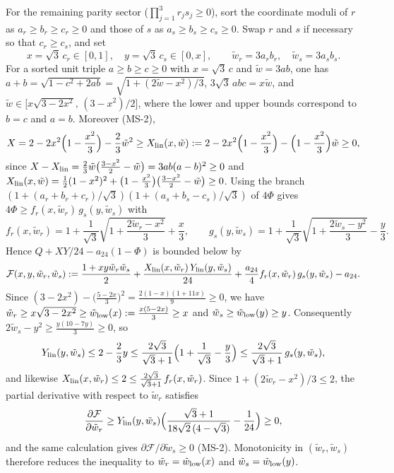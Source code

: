 For the remaining parity sector ($\prod_{j=1}^3 r_j s_j\ge0$), sort the
coordinate moduli of $r$ as $a_r\ge b_r\ge c_r\ge0$ and those of $s$ as
$a_s\ge b_s\ge c_s\ge0$. Swap $r$ and $s$ if necessary so that
$c_r\ge c_s$, and set
\[
 x=\sqrt3\,c_r\in[0,1],\quad y=\sqrt3\,c_s\in[0,x],\qquad
 \tilde w_r=3a_rb_r,\quad \tilde w_s=3a_sb_s.
\]
For a sorted unit triple $a\ge b\ge c\ge0$ with $x=\sqrt3\,c$ and
$\tilde w=3ab$, one has $a+b=\sqrt{1-c^2+2ab}=\sqrt{1+(2\tilde w-x^2)/3}$,
$3\sqrt3\,abc=x\tilde w$, and
$\tilde w\in\bigl[x\sqrt{3-2x^2},\,(3-x^2)/2\bigr]$, where the lower and
upper bounds correspond to $b=c$ and $a=b$. Moreover (MS-2),
\[
 X=2-2x^2\Bigl(1-\frac{x^2}{3}\Bigr)-\frac23\tilde w^2
  \ge X_{\rm lin}(x,\tilde w)
  :=2-2x^2\Bigl(1-\frac{x^2}{3}\Bigr)-\Bigl(1-\frac{x^2}{3}\Bigr)\tilde w\ge0,
\]
since $X-X_{\rm lin}=\frac23\tilde w\bigl(\frac{3-x^2}{2}-\tilde w\bigr)=3ab(a-b)^2\ge0$
and $X_{\rm lin}(x,\tilde w)=\frac12(1-x^2)^2+\bigl(1-\frac{x^2}{3}\bigr)\bigl(\frac{3-x^2}{2}-\tilde w\bigr)\ge0$.
Using the branch $(1+(a_r+b_r+c_r)/\sqrt3)(1+(a_s+b_s-c_s)/\sqrt3)$ of $4\Phi$ gives
$4\Phi\ge f_r(x,\tilde w_r)\,g_s(y,\tilde w_s)$ with
\[
 f_r(x,\tilde w_r)=1+\frac1{\sqrt3}\sqrt{1+\frac{2\tilde w_r-x^2}{3}}+\frac x3,\qquad
 g_s(y,\tilde w_s)=1+\frac1{\sqrt3}\sqrt{1+\frac{2\tilde w_s-y^2}{3}}-\frac y3.
\]
Hence $Q+XY/24-a_{24}(1-\Phi)$ is bounded below by
\[
 \mathcal F(x,y,\tilde w_r,\tilde w_s)
 :=\frac{1+xy\tilde w_r\tilde w_s}{2}
   +\frac{X_{\rm lin}(x,\tilde w_r)\,Y_{\rm lin}(y,\tilde w_s)}{24}
   +\frac{a_{24}}{4}f_r(x,\tilde w_r)\,g_s(y,\tilde w_s)-a_{24}.
\]
Since $(3-2x^2)-\bigl(\frac{5-2x}{3}\bigr)^2=\frac{2(1-x)(1+11x)}{9}\ge0$,
we have $\tilde w_r\ge x\sqrt{3-2x^2}\ge\tilde w_{\rm low}(x):=\frac{x(5-2x)}{3}\ge x$
and $\tilde w_s\ge\tilde w_{\rm low}(y)\ge y$. Consequently $2\tilde w_s-y^2\ge\frac{y(10-7y)}{3}\ge0$, so
\[
 Y_{\rm lin}(y,\tilde w_s)\le2-\frac23y
 \le\frac{2\sqrt3}{\sqrt3+1}\Bigl(1+\frac1{\sqrt3}-\frac y3\Bigr)
 \le\frac{2\sqrt3}{\sqrt3+1}\,g_s(y,\tilde w_s),
\]
and likewise $X_{\rm lin}(x,\tilde w_r)\le2\le\frac{2\sqrt3}{\sqrt3+1}\,f_r(x,\tilde w_r)$.
Since $1+(2\tilde w_r-x^2)/3\le2$, the partial derivative with respect to $\tilde w_r$ satisfies
\[
 \frac{\partial\mathcal F}{\partial\tilde w_r}
 \ge Y_{\rm lin}(y,\tilde w_s)\Bigl(\frac{\sqrt3+1}{18\sqrt2\,(4-\sqrt3)}-\frac1{24}\Bigr)\ge0,
\]
and the same calculation gives $\partial\mathcal F/\partial\tilde w_s\ge0$ (MS-2). Monotonicity in $(\tilde w_r,\tilde w_s)$
therefore reduces the inequality to $\tilde w_r=\tilde w_{\rm low}(x)$ and
$\tilde w_s=\tilde w_{\rm low}(y)$.

